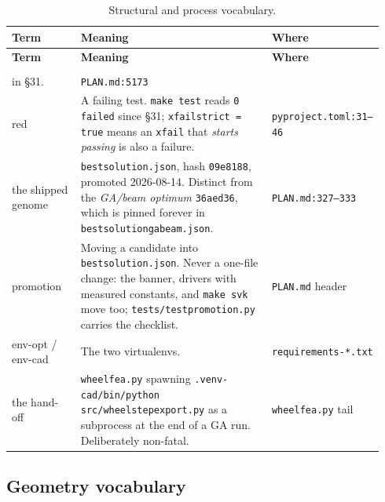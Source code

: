 \documentclass[11pt,a4paper]{article}
\makeatletter
\DeclareRobustCommand{\code}[1]{%
  \texttt{\small\def\_{\textunderscore\discretionary{}{}{}}#1}}
\newcommand{\at}[2]{\code{#1:#2}}
\newenvironment{termtable}[1]
  {\small\begin{longtable}{@{}>{\raggedright\arraybackslash}p{0.19\linewidth}
                             >{\raggedright\arraybackslash}p{0.54\linewidth}
                             >{\raggedright\arraybackslash}p{0.21\linewidth}@{}}
   \caption{#1}\\
   \toprule
   \textbf{Term} & \textbf{Meaning} & \textbf{Where} \\
   \midrule
   \endfirsthead
   \toprule
   \textbf{Term} & \textbf{Meaning} & \textbf{Where} \\
   \midrule
   \endhead
   \midrule
   \multicolumn{3}{r@{}}{\emph{continued on the next page}}\\
   \endfoot
   \bottomrule
   \endlastfoot}
  {\end{longtable}}
\makeatother
\begin{document}
\begin{termtable}{Structural and process vocabulary.}
  in \S31. &
  \at{PLAN.md}{5173} \\
\addlinespace
red &
  A failing test. \code{make test} reads \code{0 failed} since \S31;
  \code{xfail\_strict = true} means an \code{xfail} that \emph{starts passing} is also a
  failure. &
  \at{pyproject.toml}{31--46} \\
\addlinespace
the shipped genome &
  \code{best\_solution.json}, hash \code{09e8188}, promoted 2026-08-14. Distinct from
  the \emph{GA/beam optimum} \code{36aed36}, which is pinned forever in
  \code{best\_solution\_ga\_beam.json}. &
  \at{PLAN.md}{327--333} \\
\addlinespace
promotion &
  Moving a candidate into \code{best\_solution.json}. Never a one-file change: the
  banner, drivers with measured constants, and \code{make svk} move too;
  \code{tests/test\_promotion.py} carries the checklist. &
  \code{PLAN.md} header \\
\addlinespace
env-opt / env-cad &
  The two virtualenvs. &
  \code{requirements-*.txt} \\
\addlinespace
the hand-off &
  \code{wheel\_fea.py} spawning \code{.venv-cad/bin/python src/wheel\_step\_export.py}
  as a subprocess at the end of a GA run. Deliberately non-fatal. &
  \code{wheel\_fea.py} tail \\
\end{termtable}

\subsection{Geometry vocabulary}
\end{document}
